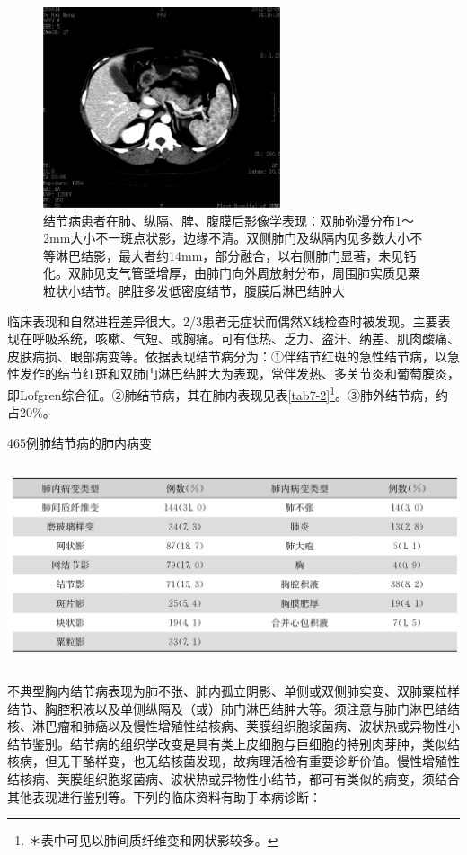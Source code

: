 \begin{figure}[!htbp]
 \centering
 \includegraphics[width=2.75in,height=2.32292in]{./images/Image00058.jpg}
 \caption{结节病患者在肺、纵隔、脾、腹膜后影像学表现：双肺弥漫分布1～2mm大小不一斑点状影，边缘不清。双侧肺门及纵隔内见多数大小不等淋巴结影，最大者约14mm，部分融合，以右侧肺门显著，未见钙化。双肺见支气管壁增厚，由肺门向外周放射分布，周围肺实质见粟粒状小结节。脾脏多发低密度结节，腹膜后淋巴结肿大}
 \label{fig7-5}
  \end{figure} 

临床表现和自然进程差异很大。2/3患者无症状而偶然X线检查时被发现。主要表现在呼吸系统，咳嗽、气短、或胸痛。可有低热、乏力、盗汗、纳差、肌肉酸痛、皮肤病损、眼部病变等。依据表现结节病分为：①伴结节红斑的急性结节病，以急性发作的结节红斑和双肺门淋巴结肿大为表现，常伴发热、多关节炎和葡萄膜炎，即Lofgren综合征。②肺结节病，其在肺内表现见表\ref{tab7-2}\footnote{＊表中可见以肺间质纤维变和网状影较多。}。③肺外结节病，约占20\%。

\begin{table}[htbp]
\centering
\caption{465例肺结节病的肺内病变}
\label{tab7-2}
\includegraphics[width=5.92708in,height=2.33333in]{./images/Image00059.jpg}
\end{table}

不典型胸内结节病表现为肺不张、肺内孤立阴影、单侧或双侧肺实变、双肺粟粒样结节、胸腔积液以及单侧纵隔及（或）肺门淋巴结肿大等。须注意与肺门淋巴结结核、淋巴瘤和肺癌以及慢性增殖性结核病、荚膜组织胞浆菌病、波状热或异物性小结节鉴别。结节病的组织学改变是具有类上皮细胞与巨细胞的特别肉芽肿，类似结核病，但无干酪样变，也无结核菌发现，故病理活检有重要诊断价值。慢性增殖性结核病、荚膜组织胞浆菌病、波状热或异物性小结节，都可有类似的病变，须结合其他表现进行鉴别等。下列的临床资料有助于本病诊断：

